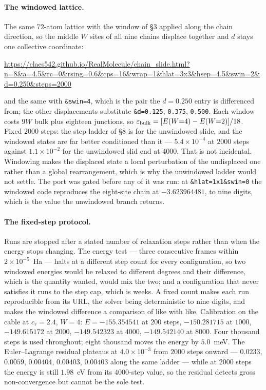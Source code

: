 \documentclass[11pt]{article}
\begin{document}
\paragraph{The windowed lattice.} The same $72$-atom lattice with the window of \S3 applied along
the chain direction, so the middle $W$ sites of all nine chains displace together and $d$ stays one
collective coordinate:
\begin{center}\small\url{https://claes542.github.io/RealMolecule/chain_slide.html?n=8&a=4.5&rc=0&rsing=0.6&cps=16&wrap=1&hlat=3x3&hsep=4.5&swin=2&d=0.250&steps=2000}\end{center}
and the same with \texttt{\&swin=4}, which is the pair the $d=0.250$ entry is differenced from;
the other displacements substitute \texttt{\&d=0.125}, \texttt{0.375}, \texttt{0.500}. Each window
costs $9W$ bulk plus eighteen junctions, so
$\varepsilon_{\rm bulk}=[E(W{=}4)-E(W{=}2)]/18$. Fixed $2000$ steps: the step ladder of \S8 is for the
unwindowed slide, and the windowed states are far better conditioned than it --- $5.4\times10^{-4}$
at $2000$ steps against $1.1\times10^{-2}$ for the unwindowed slid end at $4000$. That is not
incidental. Windowing makes the displaced state a local perturbation of the undisplaced one rather
than a global rearrangement, which is why the unwindowed ladder would not settle.
The port was gated before any of it was run: at \texttt{\&hlat=1x1\&swin=0} the windowed code
reproduces the eight-site chain at $-3.623964481$, to nine digits, which is the value the unwindowed
branch returns.

\paragraph{The fixed-step protocol.} Runs are stopped after a stated number of relaxation steps
rather than when the energy stops changing. The energy test --- three consecutive frames within
$2\times10^{-5}$~Ha --- halts at a different step count for every configuration, so two windowed
energies would be relaxed to different degrees and their difference, which is the quantity wanted, would
mix the two; and a configuration that never satisfies it runs to the step cap, which is weeks.
A fixed count makes each run reproducible from its URL, the solver being deterministic to nine
digits, and makes the windowed difference a comparison of like with like. Calibration on the cable
at $c_r=2.4$, $W=4$: $E=-155.354541$ at $200$ steps, $-150.281715$ at $1000$, $-149.615172$ at
$2000$, $-149.542323$ at $4000$, $-149.542140$ at $8000$. Four thousand steps is used throughout;
eight thousand moves the energy by $5.0$~meV. The Euler--Lagrange residual plateaus at
$4.0\times10^{-3}$ from $2000$ steps onward --- $0.0233$, $0.0059$, $0.00404$, $0.00403$, $0.00403$
along the same ladder --- while at $2000$ steps the energy is still $1.98$~eV from its $4000$-step
value, so the residual detects gross non-convergence but cannot be the sole test.
\end{document}
